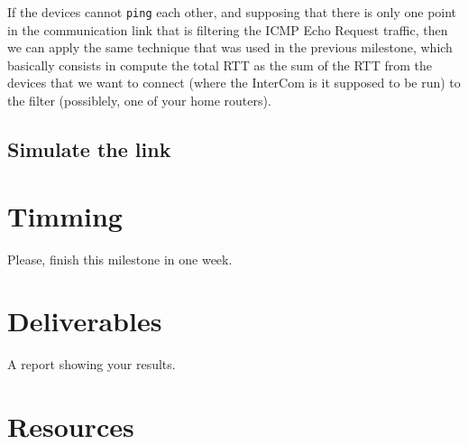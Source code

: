 If the devices cannot \texttt{ping} each other, and supposing that
there is only one point in the communication link that is filtering
the ICMP Echo Request traffic, then we can apply the same technique
that was used in the previous milestone, which basically consists in
compute the total RTT as the sum of the RTT from the devices that we
want to connect (where the InterCom is it supposed to be run) to the
filter (possiblely, one of your home routers).

\subsection{Simulate the link}

\section{Timming}

Please, finish this milestone in one week.

\section{Deliverables}

A report showing your results.

\section{Resources}



